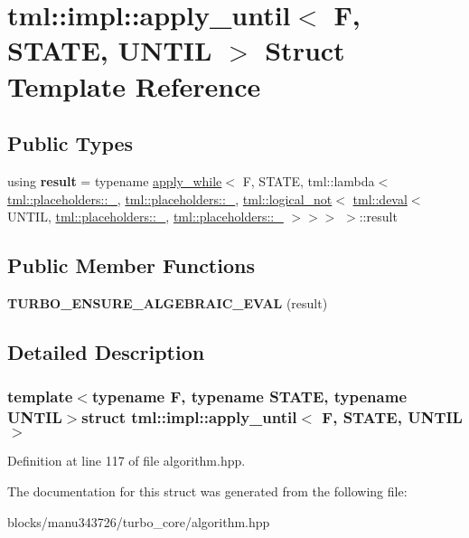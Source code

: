 \hypertarget{structtml_1_1impl_1_1apply__until}{\section{tml\+:\+:impl\+:\+:apply\+\_\+until$<$ F, S\+T\+A\+T\+E, U\+N\+T\+I\+L $>$ Struct Template Reference}
\label{structtml_1_1impl_1_1apply__until}
}
\subsection*{Public Types}
\begin{DoxyCompactItemize}
\item 
\hypertarget{structtml_1_1impl_1_1apply__until_a6cabeedd01f0cd839a570f43a297684f}{using {\bfseries result} = typename \hyperlink{structtml_1_1impl_1_1apply__while}{apply\+\_\+while}$<$ F, S\+T\+A\+T\+E, tml\+::lambda$<$ \hyperlink{structtml_1_1placeholder}{tml\+::placeholders\+::\+\_}, \hyperlink{structtml_1_1placeholder}{tml\+::placeholders\+::\+\_}, \hyperlink{structtml_1_1logical__not}{tml\+::logical\+\_\+not}$<$ \hyperlink{structtml_1_1delayed__eval}{tml\+::deval}$<$ U\+N\+T\+I\+L, \hyperlink{structtml_1_1placeholder}{tml\+::placeholders\+::\+\_}, \hyperlink{structtml_1_1placeholder}{tml\+::placeholders\+::\+\_} $>$$>$$>$ $>$\+::result}\label{structtml_1_1impl_1_1apply__until_a6cabeedd01f0cd839a570f43a297684f}

\end{DoxyCompactItemize}
\subsection*{Public Member Functions}
\begin{DoxyCompactItemize}
\item 
\hypertarget{structtml_1_1impl_1_1apply__until_a4d3f1d397c567049962f09e0c4aec9ec}{{\bfseries T\+U\+R\+B\+O\+\_\+\+E\+N\+S\+U\+R\+E\+\_\+\+A\+L\+G\+E\+B\+R\+A\+I\+C\+\_\+\+E\+V\+A\+L} (result)}\label{structtml_1_1impl_1_1apply__until_a4d3f1d397c567049962f09e0c4aec9ec}

\end{DoxyCompactItemize}


\subsection{Detailed Description}
\subsubsection*{template$<$typename F, typename S\+T\+A\+T\+E, typename U\+N\+T\+I\+L$>$struct tml\+::impl\+::apply\+\_\+until$<$ F, S\+T\+A\+T\+E, U\+N\+T\+I\+L $>$}



Definition at line 117 of file algorithm.\+hpp.



The documentation for this struct was generated from the following file\+:\begin{DoxyCompactItemize}
\item 
blocks/manu343726/turbo\+\_\+core/algorithm.\+hpp\end{DoxyCompactItemize}
